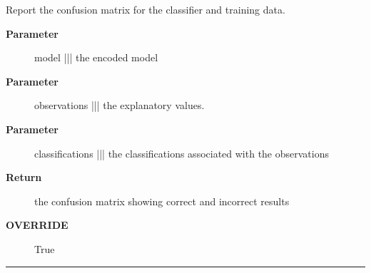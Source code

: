 \par
Report the confusion matrix for the classifier and training data.

\par
\begin{description}
\item [\textbf{Parameter}] model ||| the encoded model
\item [\textbf{Parameter}] observations ||| the explanatory values.
\item [\textbf{Parameter}] classifications ||| the classifications associated with the observations
\item [\textbf{Return}] the confusion matrix showing correct and incorrect results
\item [\textbf{OVERRIDE}] True
\end{description}

\rule{\linewidth}{0.5pt}


